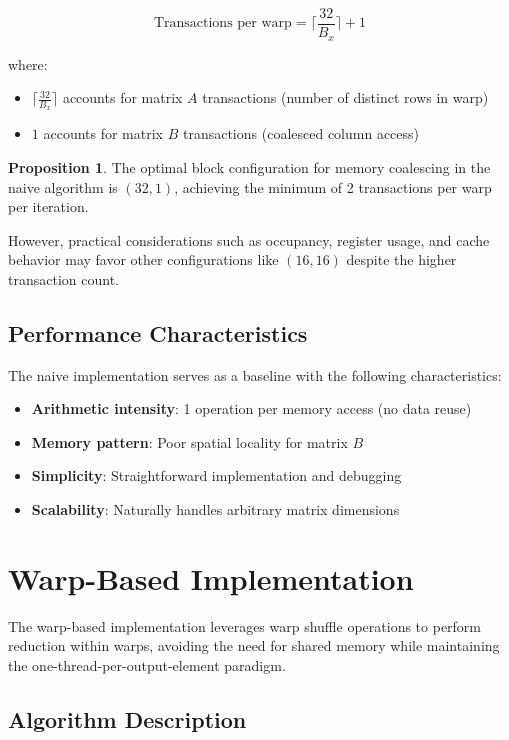 \documentclass{amsbook}
\theoremstyle{definition}
\newtheorem{proposition}{Proposition}[chapter]
\begin{document}
\begin{equation}
\text{Transactions per warp} = \lceil \frac{32}{B_x} \rceil + 1
\end{equation}

where:
\begin{itemize}
\item $\lceil \frac{32}{B_x} \rceil$ accounts for matrix $A$ transactions (number of distinct rows in warp)
\item $1$ accounts for matrix $B$ transactions (coalesced column access)
\end{itemize}

\begin{proposition}
The optimal block configuration for memory coalescing in the naive algorithm is $(32, 1)$, achieving the minimum of 2 transactions per warp per iteration.
\end{proposition}

However, practical considerations such as occupancy, register usage, and cache behavior may favor other configurations like $(16, 16)$ despite the higher transaction count.

\subsection{Performance Characteristics}

The naive implementation serves as a baseline with the following characteristics:
\begin{itemize}
\item \textbf{Arithmetic intensity}: 1 operation per memory access (no data reuse)
\item \textbf{Memory pattern}: Poor spatial locality for matrix $B$
\item \textbf{Simplicity}: Straightforward implementation and debugging
\item \textbf{Scalability}: Naturally handles arbitrary matrix dimensions
\end{itemize}

\section{Warp-Based Implementation}

The warp-based implementation leverages warp shuffle operations to perform reduction within warps, avoiding the need for shared memory while maintaining the one-thread-per-output-element paradigm.

\subsection{Algorithm Description}
\end{document}
